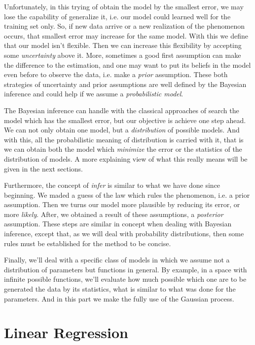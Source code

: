 \documentclass[11pt]{article} %
\begin{document}
Unfortunately, in this trying of obtain the model by the smallest error, we may lose the capability of generalize it, i.e. our model could learned well for the training set only. So, if new data arrive or a new realization of the phenomenon occurs, that smallest error may increase for the same model. With this we define that our model isn't flexible. Then we can increase this flexibility by accepting some \textit{uncertainty} above it. More, sometimes a good first assumption can make the difference to the estimation, and one may want to put its beliefs in the model even before to observe the data, i.e. make a \textit{prior} assumption. These both strategies of uncertainty and prior assumptions are well defined by the Bayesian inference and could help if we assume a \textit{probabilistic model}.

The Bayesian inference can handle with the classical approaches of search the model which has the smallest error, but our objective is achieve one step ahead. We can not only obtain one model, but a \textit{distribution} of possible models. And with this, all the probabilistic meaning of distribution is carried with it, that is we can obtain both the model which \textit{minimize} the error or the statistics of the distribution of models. A more explaining view of what this really means will be given in the next sections.

Furthermore, the concept of \textit{infer} is similar to what we have done since beginning. We maded a guess of the law which rules the phenomenon, i.e. a prior assumption. Then we turns our model more plausible by reducing its error, or more \textit{likely}. After, we obtained a result of these assumptions, a \textit{posterior} assumption. These steps are similar in concept when dealing with Bayesian inference,  except that, as we will deal with probability distributions, then some rules must be established for the method to be concise.

Finally, we'll deal with a specific class of models in which we assume not a distribution of parameters but functions in general. By example, in a space with infinite possible functions, we'll evaluate how much possible which one are to be generated the data by its statistics, what is similar to what was done for the parameters. And in this part we make the fully use of the Gaussian process.

\section{Linear Regression}
\end{document}
